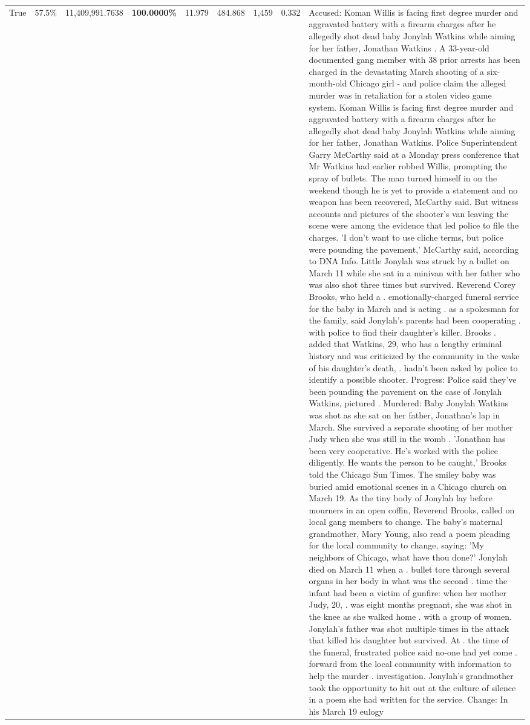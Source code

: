 \begin{table}[H]
\begin{tabular}{lllrlllll}
True & 57.5\% & 11,409,991.7638 & \bfseries \color{red} 100.0000\% & 11.979 & 484.868 & 1,459 & 0.332 & Accused: Koman Willis is facing first degree murder and aggravated battery with a firearm charges after he allegedly shot dead baby Jonylah Watkins while aiming for her father, Jonathan Watkins . A 33-year-old documented gang member with 38 prior arrests has been charged in the devastating March shooting of a six-month-old Chicago girl - and police claim the alleged murder was in retaliation for a stolen video game system. Koman Willis is facing first degree murder and aggravated battery with a firearm charges after he allegedly shot dead baby Jonylah Watkins while aiming for her father, Jonathan Watkins. Police Superintendent Garry McCarthy said at a Monday press conference that Mr Watkins had earlier robbed Willis, prompting the spray of bullets. The man turned himself in on the weekend though he is yet to provide a statement and no weapon has been recovered, McCarthy said. But witness accounts and pictures of the shooter's van leaving the scene were among the evidence that led police to file the charges. 'I don't want to use cliche terms, but police were pounding the pavement,' McCarthy said, according to DNA Info. Little Jonylah was struck by a bullet on March 11 while she sat in a minivan with her father who was also shot three times but survived. Reverend Corey Brooks, who held a . emotionally-charged funeral service for the baby in March and is acting . as a spokesman for the family, said Jonylah's parents had been cooperating . with police to find their daughter's killer. Brooks . added that Watkins, 29, who has a lengthy criminal history and was criticized by the community in the wake of his daughter's death, . hadn't been asked by police to identify a possible shooter. Progress: Police said they've been pounding the pavement on the case of Jonylah Watkins, pictured . Murdered: Baby Jonylah Watkins was shot as she sat on her father, Jonathan's lap in March. She survived a separate shooting of her mother Judy when she was still in the womb . 'Jonathan has been very cooperative. He's worked with the police diligently. He wants the person to be caught,' Brooks told the Chicago Sun Times. The smiley baby was buried amid emotional scenes in a Chicago church on March 19. As the tiny body of Jonylah lay before mourners in an open coffin, Reverend Brooks, called on local gang members to change. The baby's maternal grandmother, Mary Young, also read a poem pleading for the local community to change, saying: 'My neighbors of Chicago, what have thou done?' Jonylah died on March 11 when a . bullet tore through several organs in her body in what was the second . time the infant had been a victim of gunfire: when her mother Judy, 20, . was eight months pregnant, she was shot in the knee as she walked home . with a group of women. Jonylah's father was shot multiple times in the attack that killed his daughter but survived. At . the time of the funeral, frustrated police said no-one had yet come . forward from the local community with information to help the murder . investigation. Jonylah's grandmother took the opportunity to hit out at the culture of silence in a poem she had written for the service. Change: In his March 19 eulogy 
\end{tabular}
\end{table}

